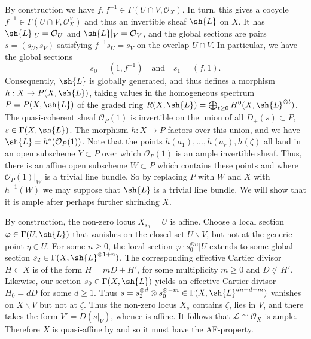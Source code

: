 \documentclass[12pt]{amsart}
\newcommand{\quadand}{\quad\text{and}\quad}
\newcommand{\ra}{\rightarrow}
\begin{document}
By construction we have $f,f^{-1}\in\Gamma(U\cap V,\mathcal{O}_X)$. In turn, this gives a cocycle $f^{-1}\in\Gamma(U\cap V,\mathcal{O}_X^\times)$
and thus an invertible sheaf $\sh{L}$ on $X$. It has $\sh{L}|_U=\mathcal{O}_U$ and $\sh{L}|_V=\mathcal{O}_V$, and the 
global sections are pairs $s=(s_U,s_V)$ satisfying $f^{-1}s_U=s_V$ on the overlap $U\cap V$.
In particular, we have the global sections 
$$
s_0=(1,f^{-1})\quadand s_1=(f,1).
$$
Consequently, $\sh{L}$ is globally generated,
and thus defines a morphism 
$h:X\ra P(X,\sh{L})$,
taking values in the homogeneous spectrum $P=P(X,\sh{L})$ of the graded ring $R(X,\sh{L})=\bigoplus_{t\geq 0} H^0(X,\sh{L}^{\otimes t})$.
The quasi-coherent sheaf $\mathcal{O}_P(1)$ is invertible on the union of all $D_+(s)\subset P$,  $s\in\Gamma(X,\sh{L})$. The morphism $h:X\ra P$ 
factors over this union, and we have $\sh{L}=h^*(\mathcal{O}_P(1))$. Note that the points $h(a_1),...,h(a_r), h(\zeta)$ all land in an open subscheme $Y \subset P$ over which $\mathcal{O}_P(1)$ is an ample invertible sheaf. Thus, there is an affine open subscheme $W \subset P$ which contains these points and where $\mathcal{O}_P(1)|_W$ is a trivial line bundle. So by replacing $P$ with $W$ and $X$ with $h^{-1}(W)$ we may suppose that $\sh{L}$ is a trivial line bundle. We will show that it is ample after perhaps further shrinking $X$.

By construction, the non-zero locus $X_{s_0}=U$ is affine. Choose a local section $\varphi\in\Gamma(U,\sh{L})$ that vanishes on the closed set $U\smallsetminus V$,
but not at the generic point $\eta\in U$. For some $n\geq 0$, the local section $\varphi\cdot s_0^{\otimes n}|U$ extends
to some global section $s_2\in \Gamma(X,\sh{L}^{\otimes 1+n})$. The corresponding effective Cartier divisor $H\subset X$
is of the form $H=mD+H'$, for some multiplicity $m\geq 0$ and $D\not\subset H'$. Likewise, our section $s_0\in \Gamma(X,\sh{L})$
yields an effective Cartier divisor $H_0=dD$ for some $d\geq 1$. Thus $s=s_2^{\otimes d}\otimes s_0^{\otimes -m}\in \Gamma(X,\sh{L}^{dn+d-m})$
vanishes on $X\smallsetminus V$ but not at $\zeta$. Thus the non-zero locus $X_s$ contains $\zeta$, lies in $V$,
and there takes the form $V'=D(s|_V)$, whence is affine. It follows that $\mathcal{L} \cong \mathcal{O}_X$ is ample. Therefore $X$ is quasi-affine by \cite[Tag 01QE]{stacks} and so it must have the AF-property.
\end{document}
